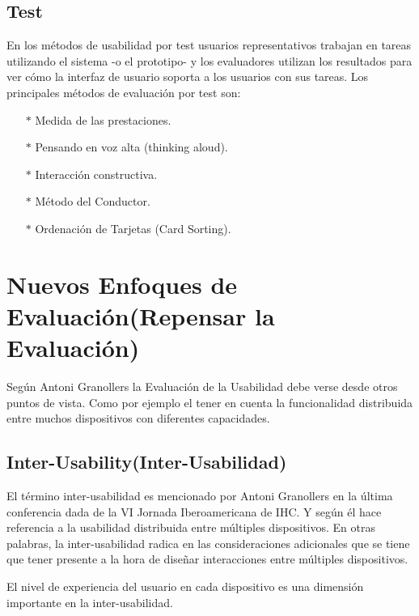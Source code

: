 \documentclass[11pt]{article}
\begin{document}
\begin{normalsize}
\begin{flushleft}
		\subsection{Test}
		\begin{itemize}
		    En los métodos de usabilidad por test usuarios representativos trabajan en tareas utilizando el sistema -o el prototipo- y los evaluadores utilizan los resultados para ver cómo la interfaz de usuario soporta a los usuarios con sus tareas.
		    Los principales métodos de evaluación por test son:
		\end{itemize}
		\begin{itemize}
		    \begin{enumerate}
		        \item [$*$] Medida de las prestaciones.
		        \item [$*$] Pensando en voz alta (thinking aloud).
		        \item [$*$] Interacción constructiva.
		        \item [$*$] Método del Conductor.
		        \item [$*$] Ordenación de Tarjetas (Card Sorting).
		    \end{enumerate}
		\end{itemize}
	\section{Nuevos Enfoques de Evaluación(Repensar la Evaluación)}
	    \begin{itemize}
	        Según Antoni Granollers la Evaluación de la Usabilidad debe verse desde otros puntos de vista. Como por ejemplo el tener en cuenta la funcionalidad distribuida entre muchos dispositivos con diferentes capacidades.
	    \end{itemize}
	    \subsection{Inter-Usability(Inter-Usabilidad)}
	    \begin{itemize}
	        El término inter-usabilidad es mencionado por Antoni Granollers en la última conferencia dada de la VI Jornada Iberoamericana de IHC. Y según él hace referencia a la usabilidad distribuida entre múltiples dispositivos. En otras palabras, la inter-usabilidad radica en las consideraciones adicionales que se tiene que tener presente a la hora de diseñar interacciones entre múltiples dispositivos.

            El nivel de experiencia del usuario en cada dispositivo es una dimensión importante en la inter-usabilidad.
	    \end{itemize}

\end{flushleft}
\end{normalsize}
\end{document}
